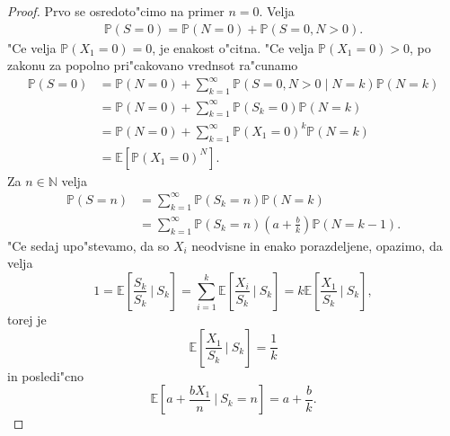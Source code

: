\documentclass[12pt, a4paper, reqno]{amsart}
\theoremstyle{definition}
\theoremstyle{plain}
\newcommand{\N}{\mathbb{N}}
\newcommand{\E}{\mathbb{E}}
\newcommand{\Prob}{\mathbb{P}}
\newcommand{\1}{\mathds{1}}
\begin{document}
    \begin{proof}
        Prvo se osredoto"cimo na primer $n = 0$. Velja
        \begin{align*}
            \Prob\left(S = 0\right)     
                = \Prob\left(N = 0\right) + \Prob\left(S = 0, N > 0\right).
        \end{align*}
        "Ce velja $\Prob(X_1 = 0) = 0$, je enakost o"citna. "Ce 
        velja $\Prob(X_1 = 0) > 0$, po zakonu za popolno pri"cakovano vrednsot ra"cunamo
        \begin{align*}
            \Prob\left(S = 0\right) 
                &= \Prob\left(N = 0\right) + \sum_{k = 1}^\infty\Prob\left(S = 0, N > 0 \mid N = k\right)\Prob\left(N = k\right) \\
                &= \Prob\left(N = 0\right) + \sum_{k = 1}^\infty\Prob\left(S_k = 0\right)\Prob\left(N = k\right) \\
                &= \Prob\left(N = 0\right) + \sum_{k = 1}^\infty\Prob\left(X_1 = 0\right)^k\Prob\left(N = k\right) \\
                &= \E\left[\Prob\left(X_1 = 0\right)^N\right].
        \end{align*}
        Za $n\in\N$ velja
        \begin{align}
            \Prob\left(S = n\right) 
                &= \sum_{k = 1}^\infty\Prob\left(S_k = n\right)\Prob\left(N = k\right) \nonumber \\
                &= \sum_{k = 1}^\infty\Prob\left(S_k = n\right)\left(a + \frac{b}{k}\right)\Prob\left(N = k - 1\right). \label{eq:PanjerRecursionSchemeProof}
        \end{align}
        "Ce sedaj upo"stevamo, da so $X_i$ neodvisne in enako porazdeljene, opazimo, da velja
        \begin{equation*}
            1 = \E\left[\frac{S_k}{S_k}\ \bigg| \ S_k\right] = \sum_{i = 1}^k\E\left[\frac{X_i}{S_k}\ \big| \ S_k\right] = k\E\left[\frac{X_1}{S_k}\ \big| \ S_k\right],
        \end{equation*}
        torej je 
        \begin{equation*}
            \E\left[\frac{X_1}{S_k} \ \bigg| \ S_k\right] = \frac{1}{k}
        \end{equation*}
        in posledi"cno 
        \begin{equation}
            \E\left[a + \frac{bX_1}{n}\ \bigg| \  S_k = n\right] = a + \frac{b}{k}.
            \label{eq:PanjerRecursionSchemeProof2}
        \end{equation}         

\end{proof}
\end{document}
